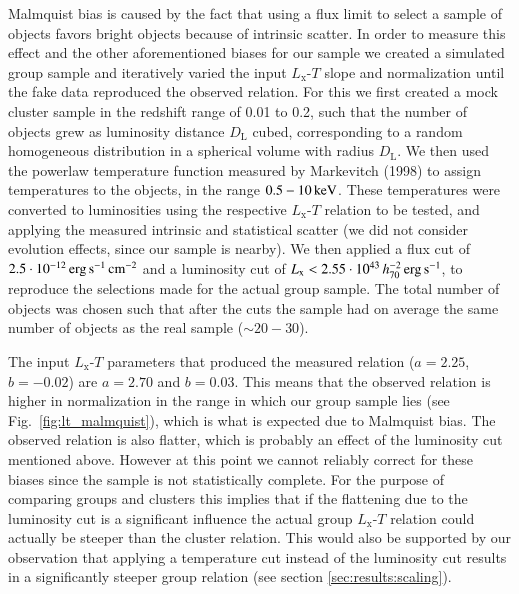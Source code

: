 \documentclass[structabstract]{aa}
\begin{document}
  Malmquist bias is caused by the fact that using a flux limit to
  select a sample of objects favors bright objects because of
  intrinsic scatter. In order to measure this effect and the other
  aforementioned biases for our sample we created a simulated group
  sample and iteratively varied the input $L_{\text{x}}$-$T$ slope
  and normalization until the fake data reproduced the observed
  relation. For this we first created a mock cluster sample in the
  redshift range of 0.01 to 0.2, such that the number of objects grew
  as luminosity distance $D_{\text{L}}$ cubed, corresponding to a
  random homogeneous distribution in a spherical volume with radius
  $D_{\text{L}}$. We then used the powerlaw temperature function
  measured by Markevitch (1998) to assign temperatures to the objects,
  in the range $\unit[0.5-10]{keV}$. These temperatures were converted
  to luminosities using the respective $L_{\text{x}}$-$T$ relation to
  be tested, and applying the measured intrinsic and statistical
  scatter (we did not consider evolution effects, since our sample is
  nearby). We then applied a flux cut of $\unit[2.5 \cdot
  10^{-12}]{erg\,s^{-1}\,cm^{-2}}$ and a luminosity cut of
  $L_{\text{x}}<2.55\cdot\unit[10^{43}\,h^{-2}_{70}]{erg\,s^{-1}}$, to
  reproduce the selections made for the actual group sample. The total
  number of objects was chosen such that after the cuts the sample had
  on average the same number of objects as the real sample
  ($\sim20-30$). 

  The input $L_{\text{x}}$-$T$ parameters that produced the measured
  relation ($a=2.25$, $b=-0.02$) are $a=2.70$ and $b=0.03$. This means
  that the observed relation is higher in normalization in the range
  in which our group sample lies (see Fig.\ \ref{fig:lt_malmquist}),
  which is what is expected due to Malmquist bias. The observed
  relation is also flatter, which is probably an effect of the
  luminosity cut mentioned above. However at this point we cannot
  reliably correct for these biases since the sample is not
  statistically complete. For the purpose of comparing groups
  and clusters this implies that if the flattening due to the
  luminosity cut is a significant influence the actual group
  $L_{\text{x}}$-$T$ relation could actually be steeper than the cluster
  relation. This would also be supported by our observation that applying
  a temperature cut instead of the luminosity cut results in a
  significantly steeper group relation (see section \ref{sec:results:scaling}).
%
\end{document}
